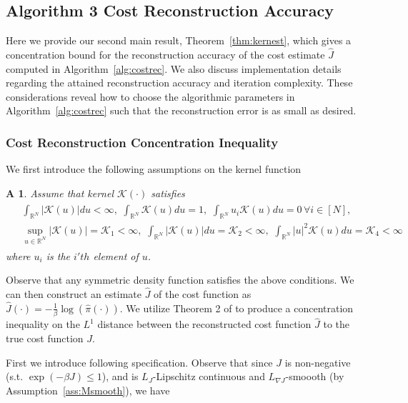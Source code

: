 \documentclass[journal,onecolumn]{IEEEtran}
\newtheorem{assumption}{A}
\newcommand{\grad}{\nabla}
\newcommand{\rew}{J}
\newcommand{\reals}{\mathbb{R}}
\newcommand{\dimn}{N}
\newcommand{\mk}{\mathcal{K}}
\newcommand{\lipJ}{L_J}
\newcommand{\lipGJ}{L_{\grad\rew}}
\begin{document}
{\color{black} \subsection{Algorithm 3 Cost Reconstruction Accuracy}
\label{sec:costrec}
Here we provide our second main result, Theorem~\ref{thm:kernest}, which gives a concentration bound for the reconstruction accuracy of the cost estimate $\hat{\rew}$ computed  in Algorithm~\ref{alg:costrec}. We also discuss implementation details regarding the attained reconstruction accuracy and iteration complexity. These considerations reveal how to choose the algorithmic parameters in Algorithm~\ref{alg:costrec} such that the reconstruction error is as small as desired.

{\subsubsection{Cost Reconstruction Concentration Inequality}
\label{subsec:costrec}
We first introduce the following assumptions on the kernel function}}
\begin{assumption}
\label{as:kernspec}
Assume that  kernel $\mk(\cdot)$  satisfies
\begin{align}
\begin{split}
\label{eq:kernas}
    &\int_{\reals^{\dimn}}|\mk(u)|du <\infty, \,\,  \int_{\reals^{\dimn}}\mk(u) du= 1, \,\, \int_{\reals^{\dimn}}u_i \mk(u)du = 0 \, \forall i\in[\dimn], \\&\sup_{u\in\reals^{\dimn}}|\mk(u)| = \mk_1 < \infty, \,\, \int_{\reals^{\dimn}}|\mk(u)|du = \mk_2 < \infty, \,\,  \int_{\reals^{\dimn}}|u|^2\mk(u)du = \mk_4 <\infty
\end{split}
\end{align}
where $u_i$ is the $i'th$ element of $u$.
\end{assumption}
Observe that any symmetric density function satisfies the above conditions. We can then construct  an estimate $\hat{\rew}$ of the cost function as $\hat{\rew}(\cdot) = -\frac{1}{\beta}\log(\hat{\pi}(\cdot))$. We utilize Theorem 2 of \cite{vogel2013uniform} to produce a concentration inequality on the $L^1$ distance between the reconstructed cost function $\hat{\rew}$ to the true cost function $\rew$.




First we introduce following specification. Observe that since $\rew$ is non-negative (s.t. $\exp(-\beta\rew) \leq 1$), and is $\lipJ$-Lipschitz continuous and $\lipGJ$-smoooth (by Assumption~\ref{ass:Msmooth}), we have 
\end{document}
